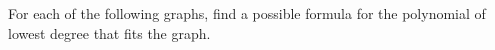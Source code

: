 \begin{activity}\label{A:0.6.2}
	For each of the following graphs, find a possible formula for the polynomial of lowest degree that fits the graph.
    \def\scl{0.7}
				\begin{center}

\end{center}
\end{activity}
